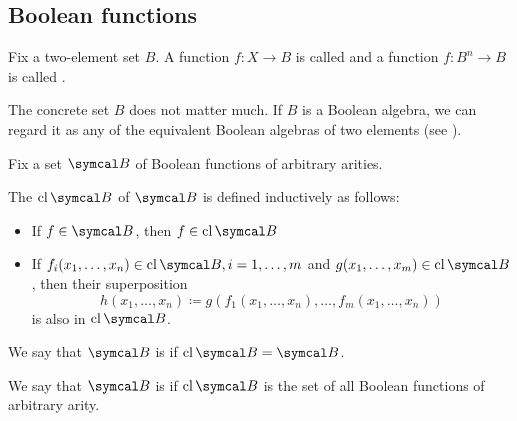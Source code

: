 \subsection{Boolean functions}\label{subsec:boolean_functions}

\begin{definition}\label{def:boolean_function}
  Fix a two-element set \( B \). A function \( f: X \to B \) is called  and a function \( f: B^n \to B \) is called .

  The concrete set \( B \) does not matter much. If \( B \) is a Boolean algebra, we can regard it as any of the equivalent Boolean algebras of two elements (see ).
\end{definition}

\begin{definition}\label{def:boolean_closure}
  Fix a set \( \Cal{B} \) of Boolean functions of arbitrary arities.

  The  \( \Cl{\Cal{B}} \) of \( \Cal{B} \) is defined inductively as follows:
  \begin{itemize}
    \item If \( f \in \Cal{B} \), then \( f \in \Cl{\Cal{B}} \)
    \item If \( f_i(x_1, \ldots, x_n) \in \Cl{\Cal{B}}, i = 1, \ldots, m \) and \( g(x_1, \ldots, x_m) \in \Cl{\Cal{B}} \), then their superposition
    \begin{equation*}
      h(x_1, \ldots, x_n) \coloneqq g(f_1(x_1, \ldots, x_n), \ldots, f_m(x_1, \ldots, x_n))
    \end{equation*}
    is also in \( \Cl{\Cal{B}} \).
  \end{itemize}

  We say that \( \Cal{B} \) is  if \( \Cl{\Cal{B}} = \Cal{B} \).

  We say that \( \Cal{B} \) is  if \( \Cl{\Cal{B}} \) is the set of all Boolean functions of arbitrary arity.
\end{definition}

